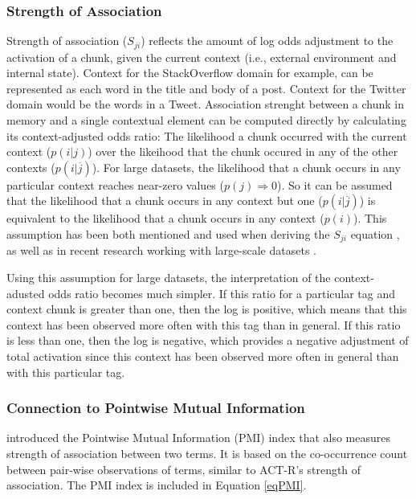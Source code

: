 \documentclass[man]{apa6}
\begin{document}
\subsubsection{Strength of Association}

Strength of association ($S_{ji}$) reflects the amount of log odds adjustment to the activation of a chunk, given the current context (i.e., external environment and internal state).
Context for the StackOverflow domain for example, can be represented as each word in the title and body of a post.
Context for the Twitter domain would be the words in a Tweet.
Association strenght between a chunk in memory and a single contextual element can be computed directly by calculating its context-adjusted odds ratio:
The likelihood a chunk occurred with the current context ($p(i|j)$) over the likeihood that the chunk occured in any of the other contexts ($p(i|\overline{j})$).
For large datasets, the likelihood that a chunk occurs in any particular context reaches near-zero values ($p(j) \Rightarrow 0$).
So it can be assumed that the likelihood that a chunk occurs in any context but one ($p(i|\overline{j})$) is equivalent to the likelihood that a chunk occurs in any context ($p(i)$).
This assumption has been both mentioned and used when deriving the $S_{ji}$ equation \parencite{Anderson1989}, as well as in recent research working with large-scale datasets \parencite{Stanley2013}.

Using this assumption for large datasets, the interpretation of the context-adusted odds ratio becomes much simpler.
If this ratio for a particular tag and context chunk is greater than one, then the log is positive, which means that this context has been observed more often with this tag than in general.
If this ratio is less than one, then the log is negative, which provides a negative adjustment of total activation since this context has been observed more often in general than with this particular tag.

\subsubsection{Connection to Pointwise Mutual Information}

\textcite{Farahat2004} introduced the Pointwise Mutual Information (PMI) index that also measures strength of association between two terms.
It is based on the co-occurrence count between pair-wise observations of terms, similar to ACT-R's strength of association.
The PMI index is included in Equation \eqref{eqPMI}.
\end{document}
